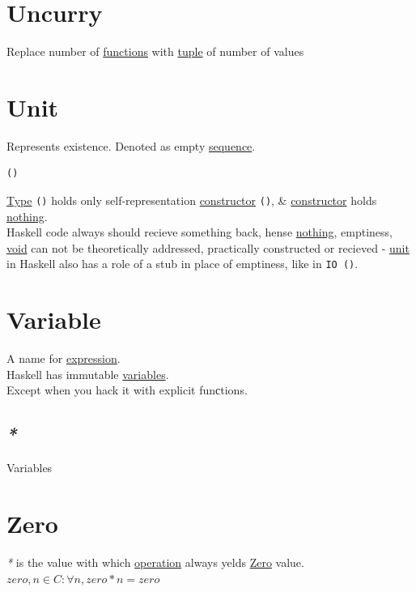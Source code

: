 \documentclass[a4paper,14pt,oneside]{book}
\begin{document}
\chapter{\label{orgfbc6cb6}Uncurry}
\label{sec:orge0326d8}
Replace number of \hyperref[org0bd6046]{functions} with \hyperref[org678e829]{tuple} of number of values\\

\chapter{\label{orgea7ee99}Unit}
\label{sec:org50e4ebc}
Represents existence. Denoted as empty \hyperref[org49f8153]{sequence}.\\
\begin{verbatim}
()
\end{verbatim}

\hyperref[orgd6db20c]{Type} \texttt{()} holds only self-representation \hyperref[org8c6d9a8]{constructor} \texttt{()}, \& \hyperref[org8c6d9a8]{constructor} holds \hyperref[org9ba77f5]{nothing}.\\

Haskell code always should recieve something back, hense \hyperref[org9ba77f5]{nothing}, emptiness, \hyperref[org2bd057a]{void} can not be theoretically addressed, practically constructed or recieved - \hyperref[orgea7ee99]{unit} in Haskell also has a role of a stub in place of emptiness, like in \texttt{IO ()}.\\

\chapter{\label{org029d8fd}Variable}
\label{sec:org6efbdd1}
A name for \hyperref[org6aa6989]{expression}.\\

Haskell has immutable \hyperref[org8831698]{variables}.\\
Except when you hack it with explicit funсtions.\\

\section{\emph{*}}
\label{sec:org60a8122}

\label{org8831698}Variables\\

\chapter{\label{org5935190}Zero}
\label{sec:org370b5dd}
\emph{*} is the value with which \hyperref[org6ed0c27]{operation} always yelds \hyperref[org5935190]{Zero} value.\\
\(zero, n \in C : \forall n, zero*n=zero\)\\
\end{document}
